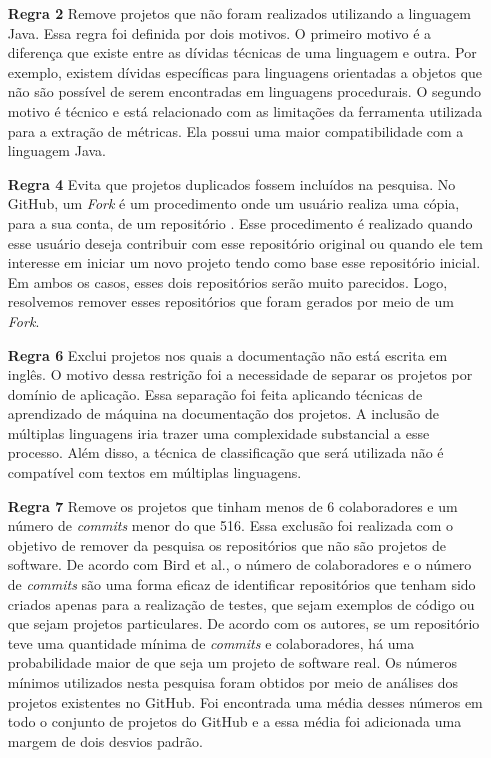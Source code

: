 \begin{itemize}
\item[\textbf{Regra 2}] Remove projetos que não foram realizados utilizando a linguagem Java. Essa regra foi definida por dois motivos. O primeiro motivo é a diferença que existe entre as dívidas técnicas de uma linguagem e outra. Por exemplo, existem dívidas específicas para linguagens orientadas a objetos que não são possível de serem encontradas em linguagens procedurais. O segundo motivo é técnico e está relacionado com as limitações da ferramenta utilizada para a extração de métricas. Ela possui uma maior compatibilidade com a linguagem Java.
\item[\textbf{Regra 4}] Evita que projetos duplicados fossem incluídos na pesquisa. No GitHub, um \textit{Fork} é um procedimento onde um usuário realiza uma cópia, para a sua conta, de um repositório \cite{thung2013network}. Esse procedimento é realizado quando esse usuário deseja contribuir com esse repositório original ou quando ele tem interesse em iniciar um novo projeto tendo como base esse repositório inicial. Em ambos os casos, esses dois repositórios serão muito parecidos. Logo, resolvemos remover esses repositórios que foram gerados por meio de um \textit{Fork}.
\item[\textbf{Regra 6}] Exclui projetos nos quais a documentação não está escrita em inglês. O motivo dessa restrição foi a necessidade de separar os projetos por domínio de aplicação. Essa separação foi feita aplicando técnicas de aprendizado de máquina  na documentação dos projetos.  A inclusão de múltiplas linguagens iria trazer uma complexidade substancial a esse processo. Além disso, a técnica de classificação que será utilizada não é compatível com textos em múltiplas linguagens.
\item[\textbf{Regra 7}] Remove os projetos que tinham menos de 6 colaboradores e um número de \textit{commits} menor do que 516. Essa exclusão foi realizada com o objetivo de remover da pesquisa os repositórios que não são projetos de software. De acordo com Bird et al.\cite{bird2009promises}, o número de colaboradores e o número de \textit{commits} são uma forma eficaz de identificar repositórios que tenham sido criados apenas para a realização de testes, que sejam exemplos de código ou que sejam projetos particulares. De acordo com os autores,  se um repositório teve uma quantidade mínima de \textit{commits} e colaboradores, há uma probabilidade maior de que seja um projeto de software real. Os números mínimos utilizados nesta pesquisa foram obtidos por meio de análises dos projetos existentes no GitHub. Foi encontrada uma média desses números em todo o conjunto de projetos do GitHub e a essa média foi adicionada uma margem de dois desvios padrão. 

\end{itemize}
